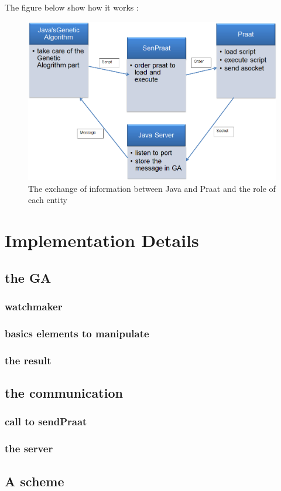 \documentclass[12pt]{report}
\begin{document}
The figure below show how it works :
\begin{figure}
\begin{center}
\includegraphics[scale=0.6]{resources/architecture.png} 
\end{center}
\caption{The exchange of information between Java and Praat and the role of each entity}
\label{ImageHumanVoice}
\end{figure}


\part{Implementation Details}
\chapter{the GA}
\section{watchmaker}
\section{basics elements to manipulate}
\section{the result}

\chapter{the communication}
\section{call to sendPraat}
\section{the server}
\appendix
\chapter{A scheme}

\listoffigures
\listoftables

 
\end{document}
